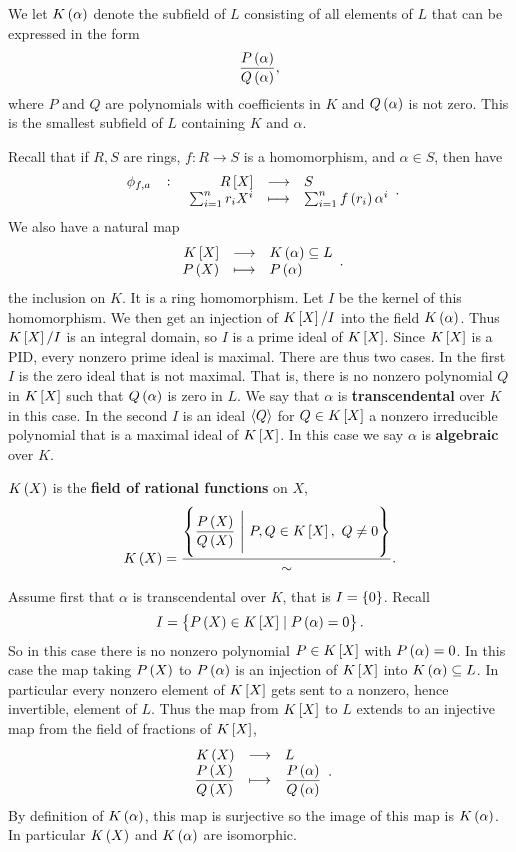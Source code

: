 \begin{definition}
We let $ K\br{\alpha} $ denote the subfield of $ L $ consisting of all elements of $ L $ that can be expressed in the form
$$ \dfrac{P\br{\alpha}}{Q\br{\alpha}}, $$
where $ P $ and $ Q $ are polynomials with coefficients in $ K $ and $ Q\br{\alpha} $ is not zero. This is the smallest subfield of $ L $ containing $ K $ and $ \alpha $.
\end{definition}

Recall that if $ R, S $ are rings, $ f : R \to S $ is a homomorphism, and $ \alpha \in S $, then have
$$ \function[\phi_{f, a}]{R\sbr{X}}{S}{\sum_{i = 1}^n r_iX^i}{\sum_{i = 1}^n f\br{r_i}\alpha^i}. $$
We also have a natural map
$$ \function{K\sbr{X}}{K\br{\alpha} \subseteq L}{P\br{X}}{P\br{\alpha}}. $$
the inclusion on $ K $. It is a ring homomorphism. Let $ I $ be the kernel of this homomorphism. We then get an injection of $ K\sbr{X} / I $ into the field $ K\br{\alpha} $. Thus $ K\sbr{X} / I $ is an integral domain, so $ I $ is a prime ideal of $ K\sbr{X} $. Since $ K\sbr{X} $ is a PID, every nonzero prime ideal is maximal. There are thus two cases. In the first $ I $ is the zero ideal that is not maximal. That is, there is no nonzero polynomial $ Q $ in $ K\sbr{X} $ such that $ Q\br{\alpha} $ is zero in $ L $. We say that $ \alpha $ is \textbf{transcendental} over $ K $ in this case. In the second $ I $ is an ideal $ \left\langle Q \right\rangle $ for $ Q \in K\sbr{X} $ a nonzero irreducible polynomial that is a maximal ideal of $ K\sbr{X} $. In this case we say $ \alpha $ is \textbf{algebraic} over $ K $.

\begin{definition}
$ K\br{X} $ is the \textbf{field of rational functions} on $ X $,
$$ K\br{X} = \dfrac{\cbr{\dfrac{P\br{X}}{Q\br{X}} \ \Bigg| \ P, Q \in K\sbr{X}, \ Q \ne 0}}{\sim}. $$
\end{definition}

\pagebreak

Assume first that $ \alpha $ is transcendental over $ K $, that is $ I = \cbr{0} $. Recall
$$ I = \cbr{P\br{X} \in K\sbr{X} \mid P\br{\alpha} = 0}. $$
So in this case there is no nonzero polynomial $ P \in K\sbr{X} $ with $ P\br{\alpha} = 0 $. In this case the map taking $ P\br{X} $ to $ P\br{\alpha} $ is an injection of $ K\sbr{X} $ into $ K\br{\alpha} \subseteq L $. In particular every nonzero element of $ K\sbr{X} $ gets sent to a nonzero, hence invertible, element of $ L $. Thus the map from $ K\sbr{X} $ to $ L $ extends to an injective map from the field of fractions of $ K\sbr{X} $,
$$ \function{K\br{X}}{L}{\dfrac{P\br{X}}{Q\br{X}}}{\dfrac{P\br{\alpha}}{Q\br{\alpha}}}. $$
By definition of $ K\br{\alpha} $, this map is surjective so the image of this map is $ K\br{\alpha} $. In particular $ K\br{X} $ and $ K\br{\alpha} $ are isomorphic.

